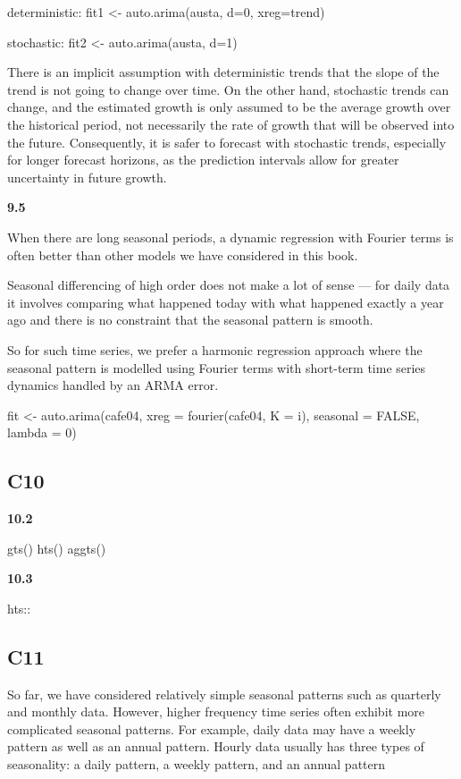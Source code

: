 \documentclass[]{book}
\begin{document}
deterministic: fit1 \textless{}- auto.arima(austa, d=0, xreg=trend)

stochastic: fit2 \textless{}- auto.arima(austa, d=1)

There is an implicit assumption with deterministic trends that the slope
of the trend is not going to change over time. On the other hand,
stochastic trends can change, and the estimated growth is only assumed
to be the average growth over the historical period, not necessarily the
rate of growth that will be observed into the future. Consequently, it
is safer to forecast with stochastic trends, especially for longer
forecast horizons, as the prediction intervals allow for greater
uncertainty in future growth.

\textbf{9.5}

When there are long seasonal periods, a dynamic regression with Fourier
terms is often better than other models we have considered in this book.

Seasonal differencing of high order does not make a lot of sense --- for
daily data it involves comparing what happened today with what happened
exactly a year ago and there is no constraint that the seasonal pattern
is smooth.

So for such time series, we prefer a harmonic regression approach where
the seasonal pattern is modelled using Fourier terms with short-term
time series dynamics handled by an ARMA error.

fit \textless{}- auto.arima(cafe04, xreg = fourier(cafe04, K = i),
seasonal = FALSE, lambda = 0)

\subsection{C10}\label{c10}

\textbf{10.2}

gts() \textbar{} hts() \textbar{} aggts()

\textbf{10.3}

hts::

\subsection{C11}\label{c11}

So far, we have considered relatively simple seasonal patterns such as
quarterly and monthly data. However, higher frequency time series often
exhibit more complicated seasonal patterns. For example, daily data may
have a weekly pattern as well as an annual pattern. Hourly data usually
has three types of seasonality: a daily pattern, a weekly pattern, and
an annual pattern
\end{document}
